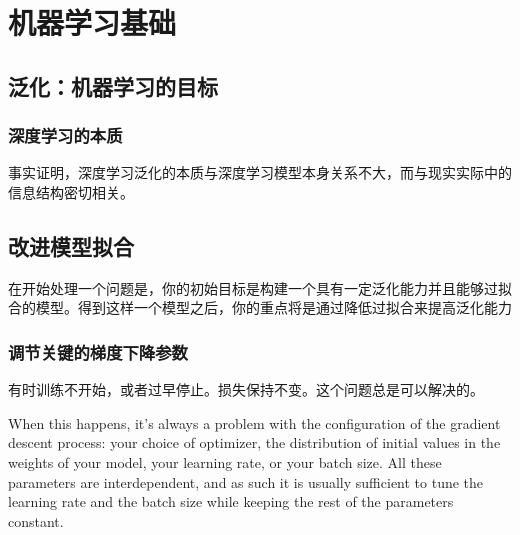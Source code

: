 \chapter{机器学习基础\label{Ch05}}
\section{泛化：机器学习的目标}
\subsection{}
\subsection{深度学习的本质}
事实证明，深度学习泛化的本质与深度学习模型本身关系不大，而与现实实际中的信息结构密切相关。
\section{改进模型拟合}
在开始处理一个问题是，你的初始目标是构建一个具有一定泛化能力并且能够过拟合的模型。得到这样一个模型之后，你的重点将是通过降低过拟合来提高泛化能力
\subsection{调节关键的梯度下降参数}
有时训练不开始，或者过早停止。损失保持不变。这个问题总是可以解决的。

When this happens, it’s always a problem with the configuration of the gradient descent process: your choice of optimizer, the distribution of initial values in the weights of your model, your learning rate, or your batch size. All these parameters are interdependent, and as such it is usually sufficient to tune the learning rate and the batch size while keeping the rest of the parameters constant.



